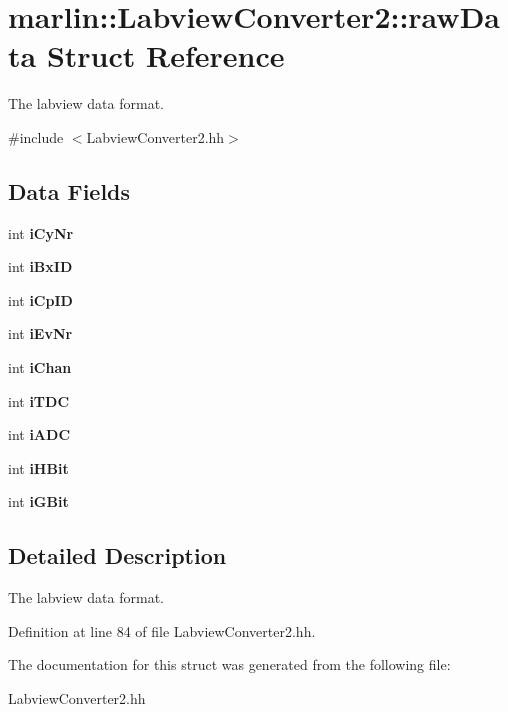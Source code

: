 \section{marlin\-:\-:Labview\-Converter2\-:\-:raw\-Data Struct Reference}
\label{structmarlin_1_1LabviewConverter2_1_1rawData}


The labview data format.  




{\ttfamily \#include $<$Labview\-Converter2.\-hh$>$}

\subsection*{Data Fields}
\begin{DoxyCompactItemize}
\item 
int {\bfseries i\-Cy\-Nr}\label{structmarlin_1_1LabviewConverter2_1_1rawData_a03006803e0b5b2da5820d8bc95b25821}

\item 
int {\bfseries i\-Bx\-I\-D}\label{structmarlin_1_1LabviewConverter2_1_1rawData_a18813688dc645068904762d7179caabf}

\item 
int {\bfseries i\-Cp\-I\-D}\label{structmarlin_1_1LabviewConverter2_1_1rawData_a4b6d90d46ac4234bb39db626efe25b90}

\item 
int {\bfseries i\-Ev\-Nr}\label{structmarlin_1_1LabviewConverter2_1_1rawData_a4e4d521b9951a3a093add42abe718d24}

\item 
int {\bfseries i\-Chan}\label{structmarlin_1_1LabviewConverter2_1_1rawData_a2c95f1ea0b28bde1aa11fa0c17831e33}

\item 
int {\bfseries i\-T\-D\-C}\label{structmarlin_1_1LabviewConverter2_1_1rawData_a70f867c80e05e01037317f08d09341fb}

\item 
int {\bfseries i\-A\-D\-C}\label{structmarlin_1_1LabviewConverter2_1_1rawData_a0a42ca5b0eb49a252c6b6fbc565978a4}

\item 
int {\bfseries i\-H\-Bit}\label{structmarlin_1_1LabviewConverter2_1_1rawData_a82258aad93b77ba908e7b751d59088a1}

\item 
int {\bfseries i\-G\-Bit}\label{structmarlin_1_1LabviewConverter2_1_1rawData_ae932bf4a10f7064fbd36b823eca20f6e}

\end{DoxyCompactItemize}


\subsection{Detailed Description}
The labview data format. 

Definition at line 84 of file Labview\-Converter2.\-hh.



The documentation for this struct was generated from the following file\-:\begin{DoxyCompactItemize}
\item 
Labview\-Converter2.\-hh\end{DoxyCompactItemize}
